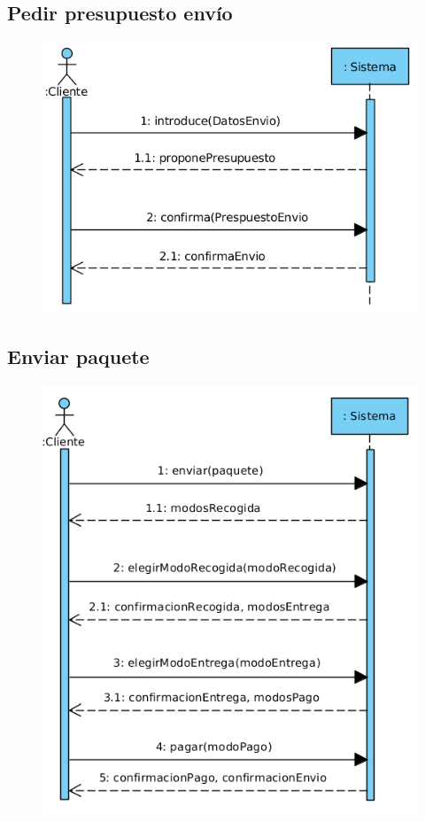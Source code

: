 \subsection{Pedir presupuesto envío}
\begin{figure}[H]
	\centering
	\includegraphics[width=16cm]{39}
\end{figure}
\subsection{Enviar paquete}
\begin{figure}[H]
	\centering
	\includegraphics[width=16cm]{40}
\end{figure}
